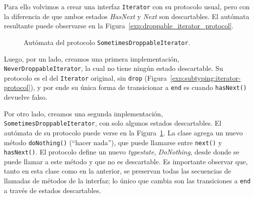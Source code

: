 Para ello volvimos a crear una interfaz \texttt{Iterator} con su protocolo usual, pero con la diferencia de que ambos estados \textit{HasNext} y \textit{Next} son descartables. El autómata resultante puede observarse en la Figura~\ref{exp:droppable_iterator_protocol}.

\begin{figure}[htbp]
\centering
{}
\caption{Autómata del protocolo \texttt{SometimesDroppableIterator}.}
\label{exp:sometimesdroppableiterator_protocol}
\end{figure}

Luego, por un lado, creamos una primera implementación, \texttt{NeverDroppableIterator}, la cual no tiene ningún estado descartable. Su protocolo es el del \texttt{Iterator} original, sin \texttt{drop} (Figura~\ref{exp:subtyping:iterator-protocol}), y por ende su única forma de transicionar a \texttt{end} es cuando \texttt{hasNext()} devuelve falso.

Por otro lado, creamos una segunda implementación, \texttt{SometimesDroppableIterator}, con solo algunos estados descartables. El autómata de su protocolo puede verse en la Figura~\ref{exp:sometimesdroppableiterator_protocol}. La clase agrega un nuevo método \texttt{doNothing()} (``hacer nada''), que puede llamarse entre \texttt{next()} y \texttt{hasNext()}. El protocolo define un nuevo \textit{typestate}, \textit{DoNothing}, desde donde se puede llamar a este método y que no es descartable. Es importante observar que, tanto en esta clase como en la anterior, se preservan todas las secuencias de llamadas de métodos de la interfaz; lo único que cambia son las transiciones a \texttt{end} a través de estados descartables.

